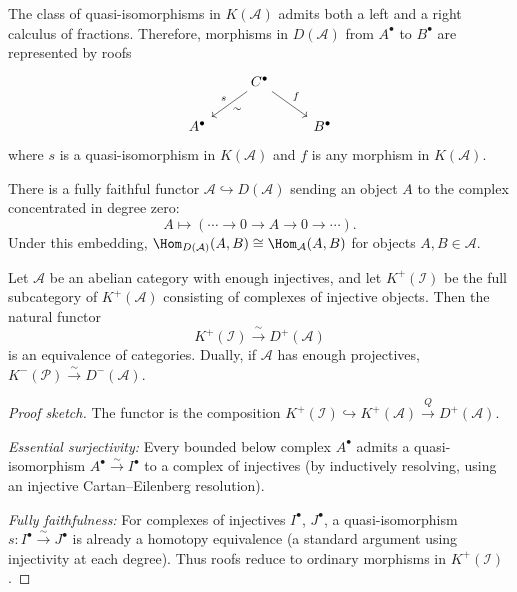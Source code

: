 \begin{theorem}\label{thm:derived-cat-roofs}
The class of quasi-isomorphisms in $K(\mathcal{A})$ admits both a left and a right calculus
of fractions. Therefore, morphisms in $D(\mathcal{A})$ from $A^\bullet$ to $B^\bullet$ are
represented by roofs
\[
\begin{tikzcd}
    & C^\bullet \arrow[dl, "s"', "\sim"] \arrow[dr, "f"] & \\
    A^\bullet & & B^\bullet
\end{tikzcd}
\]
where $s$ is a quasi-isomorphism in $K(\mathcal{A})$ and $f$ is any morphism in $K(\mathcal{A})$.
\end{theorem}

\begin{proposition}\label{prop:derived-cat-embedding}
There is a fully faithful functor $\mathcal{A} \hookrightarrow D(\mathcal{A})$ sending
an object $A$ to the complex concentrated in degree zero:
\[
    A \mapsto (\cdots \to 0 \to A \to 0 \to \cdots).
\]
Under this embedding, $\Hom_{D(\mathcal{A})}(A, B) \cong \Hom_{\mathcal{A}}(A, B)$
for objects $A, B \in \mathcal{A}$.
\end{proposition}

\begin{theorem}\label{thm:injective-resolution-equiv}
Let $\mathcal{A}$ be an abelian category with enough injectives, and let
$K^+(\mathcal{I})$ be the full subcategory of $K^+(\mathcal{A})$ consisting of
complexes of injective objects. Then the natural functor
\[
    K^+(\mathcal{I}) \xrightarrow{\;\sim\;} D^+(\mathcal{A})
\]
is an equivalence of categories. Dually, if $\mathcal{A}$ has enough projectives,
$K^-(\mathcal{P}) \xrightarrow{\sim} D^-(\mathcal{A})$.
\end{theorem}

\begin{proof}[Proof sketch]
The functor is the composition $K^+(\mathcal{I}) \hookrightarrow K^+(\mathcal{A})
\xrightarrow{Q} D^+(\mathcal{A})$.

\textit{Essential surjectivity:} Every bounded below complex $A^\bullet$ admits a
quasi-isomorphism $A^\bullet \xrightarrow{\sim} I^\bullet$ to a complex of injectives
(by inductively resolving, using an injective Cartan--Eilenberg resolution).

\textit{Fully faithfulness:} For complexes of injectives $I^\bullet$, $J^\bullet$,
a quasi-isomorphism $s \colon I^\bullet \xrightarrow{\sim} J^\bullet$ is already a
homotopy equivalence (a standard argument using injectivity at each degree).
Thus roofs reduce to ordinary morphisms in $K^+(\mathcal{I})$.
\end{proof}


